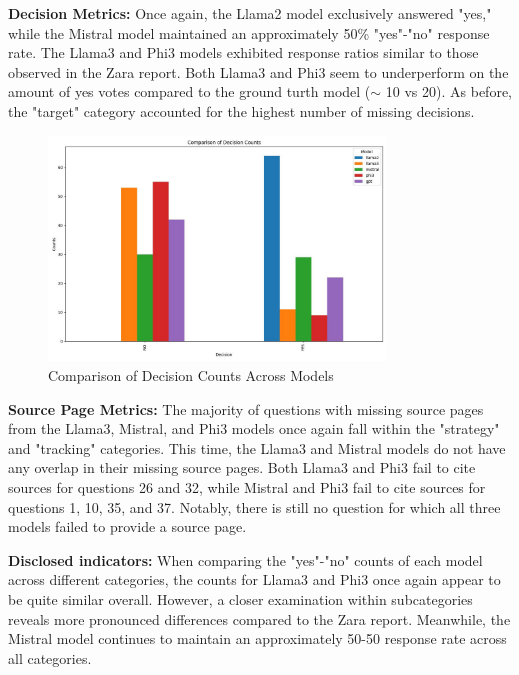 \documentclass[]{article}
\begin{document}
\textbf{Decision Metrics:}
Once again, the Llama2 model exclusively answered "yes," 
while the Mistral model maintained an approximately 50\% "yes"-"no" response rate. 
The Llama3 and Phi3 models exhibited response ratios similar to those observed in the Zara report.
Both Llama3 and Phi3 seem to underperform on the amount of yes votes compared to the ground turth model ($\sim$ 10 vs 20).
As before, the "target" category accounted for the highest number of missing decisions.

\begin{figure}[H]
    \centering
    \includegraphics[width=0.8\textwidth]{./images/hm_comparison_decision.jpg}
    \caption{Comparison of Decision Counts Across Models}
    \label{fig:image_label}
\end{figure}

\textbf{Source Page Metrics:} The majority of questions with missing source pages from the Llama3, Mistral, 
and Phi3 models once again fall within the "strategy" and 
"tracking" categories. This time, the Llama3 and Mistral models do not have any overlap in their 
missing source pages. Both Llama3 and Phi3 fail to cite sources for questions 26 and 32, 
while Mistral and Phi3 fail to cite sources for questions 1, 10, 35, and 37. 
Notably, there is still no question for which all three models failed to provide a source page.
\newline\newline

\textbf{Disclosed indicators:} When comparing the "yes"-"no" counts of each model across different categories, 
the counts for Llama3 and Phi3 once again appear to be quite similar overall. However, 
a closer examination within subcategories reveals more pronounced differences compared to the Zara report. 
Meanwhile, the Mistral model continues to maintain an approximately 50-50 response rate across all categories.
\newline\newline
\end{document}
